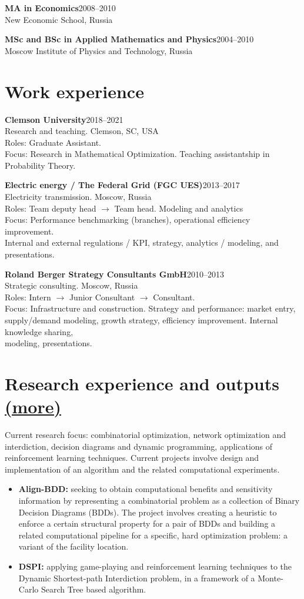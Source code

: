 \documentclass[11pt, a4paper]{article} \usepackage{geometry} %
\newcommand{\edu}[3]{
  \noindent\textbf{#1}\hfill #2\\
  #3\vspace{0.7em}}
\newcommand{\jobl}[5]{%
  \textbf{#1}\hfill #2\\
  #3\vspace{0.25em}\\
  Roles: #4\\
  Focus: #5}
\newcommand{\job}[5]{%
  \jobl{#1}{#2}{#3}{#4}{#5}\vspace{0.5em}
}
\newcommand{\mhref}[1]{\hfill\href{#1}{\small (more\faExternalLink*)}}
\begin{document}
  \edu{MA in Economics}{2008--2010}{
    New Economic School, Russia}

  \edu{MSc and BSc in Applied Mathematics and Physics}{2004--2010}{
    Moscow Institute of Physics and Technology, Russia}

  \section*{Work experience}
  \job{Clemson University}{2018--2021}{Research and teaching. Clemson, SC,
    USA}{Graduate Assistant.}{Research in Mathematical Optimization. Teaching
    assistantship in Probability Theory.}

  \noindent
  \job{Electric energy / The Federal Grid (FGC UES)}{2013--2017}{Electricity transmission.
    Moscow, Russia}{Team deputy head $\rightarrow$ Team head. Modeling and analytics}{Performance
    benchmarking (branches), operational efficiency improvement.\\ Internal
    and external regulations / KPI, strategy, analytics / modeling, and presentations.}

  \noindent
  \job{Roland Berger Strategy Consultants GmbH}{2010--2013}{Strategic consulting.
    Moscow, Russia}{Intern $\rightarrow$ Junior
    Consultant $\rightarrow$ Consultant.}{Infrastructure and construction.
    Strategy and performance: market entry,\\ supply/demand modeling, growth
    strategy, efficiency improvement. Internal knowledge sharing,\\modeling, presentations.}

  \section*{Research experience and outputs \mhref{https://www.bochkarev.io/research/}}
  Current research focus: combinatorial optimization, network optimization and
  interdiction, decision diagrams and dynamic programming, applications of
  reinforcement learning techniques. Current projects involve design and
  implementation of an algorithm and the related computational experiments.

  \begin{itemize}
    \itemsep0pt
  \item \textbf{Align-BDD:} seeking to obtain computational benefits and
    sensitivity information by representing a combinatorial problem as a
    collection of Binary Decision Diagrams (BDDs). The project involves creating a heuristic to enforce a
    certain structural property for a pair of BDDs and building a related
    computational pipeline for a specific, hard optimization problem: a
    variant of the facility location.
  \item \textbf{DSPI:} applying game-playing and reinforcement
    learning techniques to the Dynamic Shortest-path Interdiction problem,
    in a framework of a Monte-Carlo Search Tree based algorithm.
  \end{itemize}
\end{document}
